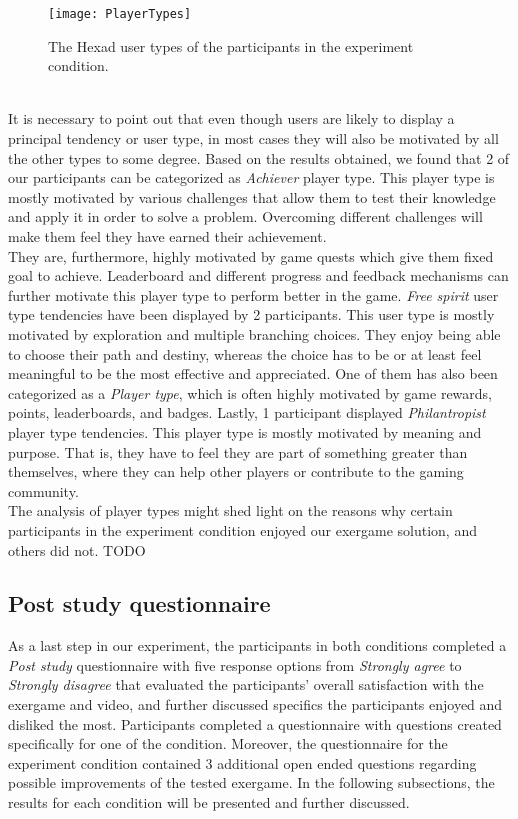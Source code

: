 \begin{figure}[h]
    \centering
    \texttt{[image: PlayerTypes]}
    \caption{The Hexad user types of the participants in the experiment condition.}
    \label{fig:playerTypes}
\end{figure}\\ It is necessary to point out that even though users are likely to display a principal tendency or user type, in most cases they will also be motivated by all the other types to some degree. Based on the results obtained, we found that 2  of our participants can be categorized as \textit{Achiever} player type. This player type is mostly motivated by various challenges that allow them to test their knowledge and apply it in order to solve a problem. Overcoming different challenges will make them feel they have earned their achievement. \\They are, furthermore, highly motivated by game quests which give them fixed goal to achieve. Leaderboard and different progress and feedback mechanisms can further motivate this player type to perform better in the game. \textit{Free spirit} user type tendencies have been displayed by 2 participants. This user type is mostly motivated by exploration and multiple branching choices. They enjoy being able to choose their path and destiny, whereas the choice has to be or at least feel meaningful to be the most effective and appreciated. One of them has also been categorized as a \textit{Player type}, which is often highly motivated by game rewards, points, leaderboards, and badges. Lastly, 1 participant displayed \textit{Philantropist} player type tendencies. This player type is mostly motivated by meaning and purpose. That is, they have to feel they are part of something greater than themselves, where they can help other players or contribute to the gaming community.  \\ %
The analysis of player types might shed light on the reasons why certain participants in the experiment condition enjoyed our exergame solution, and others did not. TODO
\subsection{Post study questionnaire}
As a last step in our experiment, the participants in both conditions completed  a \textit{Post study} questionnaire with five response options from \textit{Strongly agree} to \textit{Strongly disagree} that evaluated the participants' overall satisfaction with the exergame and video, and further discussed specifics the participants enjoyed and disliked the most. Participants completed a questionnaire with questions created specifically for one of the condition. Moreover, the questionnaire for the experiment condition contained 3 additional open ended questions regarding possible improvements of the tested exergame. In the following subsections, the results for each condition will be presented and further discussed.

